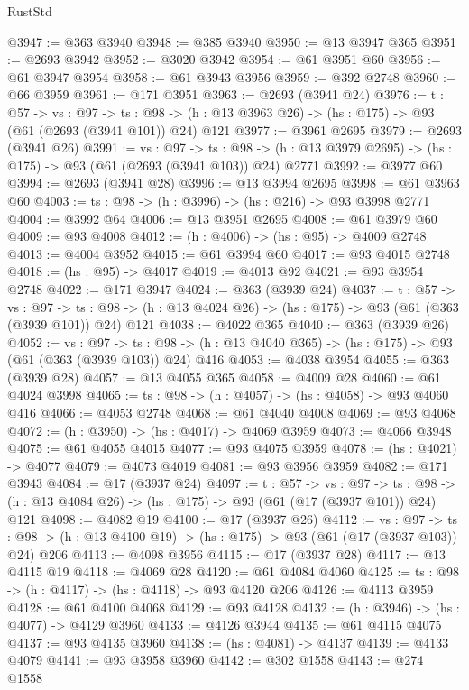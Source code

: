 \begin{lexlean}{RustStd}
\begin{coremodule}
@3947 := @363 @3940
@3948 := @385 @3940
@3950 := @13 @3947 @365
@3951 := @2693 @3942
@3952 := @3020 @3942
@3954 := @61 @3951 @60
@3956 := @61 @3947 @3954
@3958 := @61 @3943 @3956
@3959 := @392 @2748
@3960 := @66 @3959
@3961 := @171 @3951
@3963 := @2693 (@3941 @24)
@3976 := {t : @57} ->
  {vs : @97} ->
  {ts : @98} -> (h : @13 @3963 @26) -> (hs : @175) -> @93 (@61 (@2693 (@3941 @101)) @24) @121
@3977 := @3961 @2695
@3979 := @2693 (@3941 @26)
@3991 := {vs : @97} ->
  {ts : @98} -> (h : @13 @3979 @2695) -> (hs : @175) -> @93 (@61 (@2693 (@3941 @103)) @24) @2771
@3992 := @3977 @60
@3994 := @2693 (@3941 @28)
@3996 := @13 @3994 @2695
@3998 := @61 @3963 @60
@4003 := {ts : @98} -> (h : @3996) -> (hs : @216) -> @93 @3998 @2771
@4004 := @3992 @64
@4006 := @13 @3951 @2695
@4008 := @61 @3979 @60
@4009 := @93 @4008
@4012 := (h : @4006) -> (hs : @95) -> @4009 @2748
@4013 := @4004 @3952
@4015 := @61 @3994 @60
@4017 := @93 @4015 @2748
@4018 := (hs : @95) -> @4017
@4019 := @4013 @92
@4021 := @93 @3954 @2748
@4022 := @171 @3947
@4024 := @363 (@3939 @24)
@4037 := {t : @57} ->
  {vs : @97} ->
  {ts : @98} -> (h : @13 @4024 @26) -> (hs : @175) -> @93 (@61 (@363 (@3939 @101)) @24) @121
@4038 := @4022 @365
@4040 := @363 (@3939 @26)
@4052 := {vs : @97} ->
  {ts : @98} -> (h : @13 @4040 @365) -> (hs : @175) -> @93 (@61 (@363 (@3939 @103)) @24) @416
@4053 := @4038 @3954
@4055 := @363 (@3939 @28)
@4057 := @13 @4055 @365
@4058 := @4009 @28
@4060 := @61 @4024 @3998
@4065 := {ts : @98} -> (h : @4057) -> (hs : @4058) -> @93 @4060 @416
@4066 := @4053 @2748
@4068 := @61 @4040 @4008
@4069 := @93 @4068
@4072 := (h : @3950) -> (hs : @4017) -> @4069 @3959
@4073 := @4066 @3948
@4075 := @61 @4055 @4015
@4077 := @93 @4075 @3959
@4078 := (hs : @4021) -> @4077
@4079 := @4073 @4019
@4081 := @93 @3956 @3959
@4082 := @171 @3943
@4084 := @17 (@3937 @24)
@4097 := {t : @57} ->
  {vs : @97} ->
  {ts : @98} -> (h : @13 @4084 @26) -> (hs : @175) -> @93 (@61 (@17 (@3937 @101)) @24) @121
@4098 := @4082 @19
@4100 := @17 (@3937 @26)
@4112 := {vs : @97} ->
  {ts : @98} -> (h : @13 @4100 @19) -> (hs : @175) -> @93 (@61 (@17 (@3937 @103)) @24) @206
@4113 := @4098 @3956
@4115 := @17 (@3937 @28)
@4117 := @13 @4115 @19
@4118 := @4069 @28
@4120 := @61 @4084 @4060
@4125 := {ts : @98} -> (h : @4117) -> (hs : @4118) -> @93 @4120 @206
@4126 := @4113 @3959
@4128 := @61 @4100 @4068
@4129 := @93 @4128
@4132 := (h : @3946) -> (hs : @4077) -> @4129 @3960
@4133 := @4126 @3944
@4135 := @61 @4115 @4075
@4137 := @93 @4135 @3960
@4138 := (hs : @4081) -> @4137
@4139 := @4133 @4079
@4141 := @93 @3958 @3960
@4142 := @302 @1558
@4143 := @274 @1558

\end{coremodule}
\end{lexlean}
